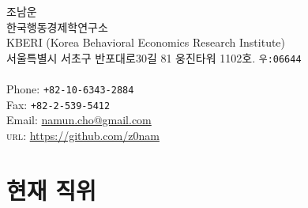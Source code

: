 \documentclass[11pt, a4paper]{article} %
\begin{document}

{\LARGE 조남운}\\[1cm] %
한국행동경제학연구소\\ %
KBERI (Korea Behavioral Economics Research Institute)\\
서울특별시 서초구 반포대로30길 81 웅진타워 1102호. \texttt{우:06644}\\
\\[.2cm]
Phone: \texttt{+82-10-6343-2884}\\ %
Fax: \texttt{+82-2-539-5412}\\[.2cm] %
Email: \href{mailto:namun.cho@gmail.com}{namun.cho@gmail.com}\\ %
\textsc{url}: \href{https://github.com/z0nam}{https://github.com/z0nam}\\ %






\section*{현재 직위}
\end{document}
